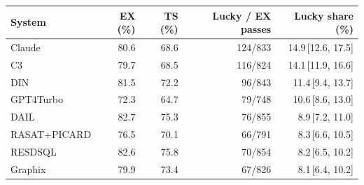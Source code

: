 \begin{tabular}{lrrrr}
\toprule
System & EX (\%) & TS (\%) & Lucky / EX passes & Lucky share (\%) \\
\midrule
Claude & 80.6 & 68.6 & 124/833 & 14.9{\,[12.6, 17.5]} \\
C3 & 79.7 & 68.5 & 116/824 & 14.1{\,[11.9, 16.6]} \\
DIN & 81.5 & 72.2 & 96/843 & 11.4{\,[9.4, 13.7]} \\
GPT4Turbo & 72.3 & 64.7 & 79/748 & 10.6{\,[8.6, 13.0]} \\
DAIL & 82.7 & 75.3 & 76/855 & 8.9{\,[7.2, 11.0]} \\
RASAT+PICARD & 76.5 & 70.1 & 66/791 & 8.3{\,[6.6, 10.5]} \\
RESDSQL & 82.6 & 75.8 & 70/854 & 8.2{\,[6.5, 10.2]} \\
Graphix & 79.9 & 73.4 & 67/826 & 8.1{\,[6.4, 10.2]} \\
\bottomrule
\end{tabular}
